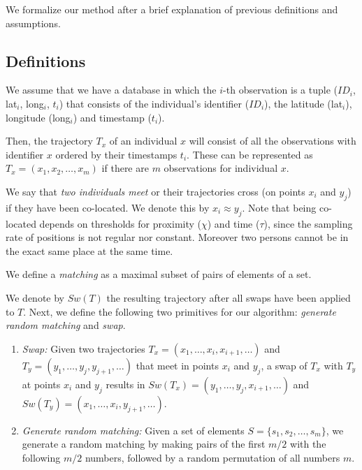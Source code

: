 \documentclass{llncs}
\begin{document}
We formalize our method after a brief explanation of previous definitions and assumptions.

\subsection{Definitions}
We assume that we have a database in which the $i$-th observation is a tuple ($ID_i$, lat$_i$, long$_i$, $t_i$) that
consists of the individual's identifier ($ID_i$), the latitude (lat$_i$), longitude (long$_i$) and timestamp ($t_i$).

Then, the trajectory $T_x$ of an individual \texttt{$x$} will consist of all the observations with identifier \texttt{$x$} ordered by their timestamps \texttt{$t_i$}.
These can be represented as $T_x = (x_1, x_2, \ldots, x_m)$ if there are $m$ observations for individual $x$.


We say that \emph{two individuals meet} or their trajectories cross (on points $x_i$ and $y_j$) if they have been co-located. We denote this by $x_i \approx y_j$. Note that being co-located depends on thresholds for proximity ($\chi$) and time ($\tau$), since the sampling rate of positions is not regular nor constant. Moreover two persons cannot be in the exact same place at the same time.

We define a \emph{matching} as a maximal subset of pairs of elements of a set.

We denote by $Sw(T)$ the resulting trajectory after all swaps have been applied to $T$.
Next, we define the following two primitives for our algorithm: \emph{generate random matching} and \emph{swap}.
\begin{enumerate}

\item \emph{Swap:}
Given two trajectories $T_x = (x_1, \ldots, x_i, x_{i+1}, \ldots)$ and \linebreak
$T_y= (y_1, \ldots, y_j, y_{j+1}, \ldots)$ that meet in points $x_i$ and $y_j$, a swap of $T_x$ with $T_y$ at points $x_i$ and $y_j$ results in $Sw(T_x) = (y_1, \ldots, y_j, x_{i+1}, \ldots)$ and
\linebreak
$Sw(T_y)= (x_1, \ldots, x_i, y_{j+1}, \ldots)$.
\item \emph{Generate random matching:}
Given a set of elements $S = \{s_1, s_2,\ldots, s_m\}$, we generate a random matching by making pairs of the first $m/2$ with the following $m/2$ numbers, followed by a random permutation of all numbers $m$.
\end{enumerate}
\end{document}
